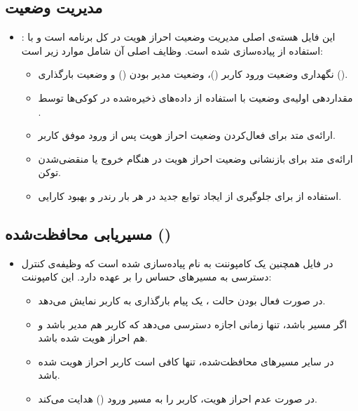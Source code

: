     \subsection{مدیریت وضعیت }
    \begin{itemize}
    	\item {}: این فایل هسته‌ی اصلی مدیریت وضعیت احراز هویت در کل برنامه است و با استفاده از  پیاده‌سازی شده است. وظایف اصلی آن شامل موارد زیر است:
    	\begin{itemize}
    		\item نگهداری وضعیت ورود کاربر ()، وضعیت مدیر بودن () و وضعیت بارگذاری ().
    		\item مقداردهی اولیه‌ی وضعیت با استفاده از داده‌های ذخیره‌شده در کوکی‌ها توسط .
    		\item ارائه‌ی متد  برای فعال‌کردن وضعیت احراز هویت پس از ورود موفق کاربر.
    		\item ارائه‌ی متد  برای بازنشانی وضعیت احراز هویت در هنگام خروج یا منقضی‌شدن توکن.
    		\item استفاده از  برای جلوگیری از ایجاد توابع جدید در هر بار رندر و بهبود کارایی.
    	\end{itemize}
    \end{itemize}
    
    \subsection{مسیریابی محافظت‌شده ()}
    \begin{itemize}
    	\item در فایل  همچنین یک کامپوننت به نام  پیاده‌سازی شده است که وظیفه‌ی کنترل دسترسی به مسیرهای حساس را بر عهده دارد. این کامپوننت:
    	\begin{itemize}
    		\item در صورت فعال بودن حالت ، یک پیام بارگذاری به کاربر نمایش می‌دهد.
    		\item اگر مسیر  باشد، تنها زمانی اجازه دسترسی می‌دهد که کاربر هم مدیر باشد و هم احراز هویت شده باشد.
    		\item در سایر مسیرهای محافظت‌شده، تنها کافی است کاربر احراز هویت شده باشد.
    		\item در صورت عدم احراز هویت، کاربر را به مسیر ورود () هدایت می‌کند.
    	\end{itemize}
    \end{itemize}
    
